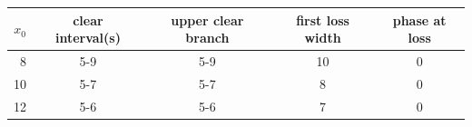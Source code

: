 \begin{tabular}{rcccc}
\toprule
$x_0$ & clear interval(s) & upper clear branch & first loss width & phase at loss \\
\midrule
8 & 5-9 & 5-9 & 10 & 0 \\
10 & 5-7 & 5-7 & 8 & 0 \\
12 & 5-6 & 5-6 & 7 & 0 \\
\bottomrule
\end{tabular}